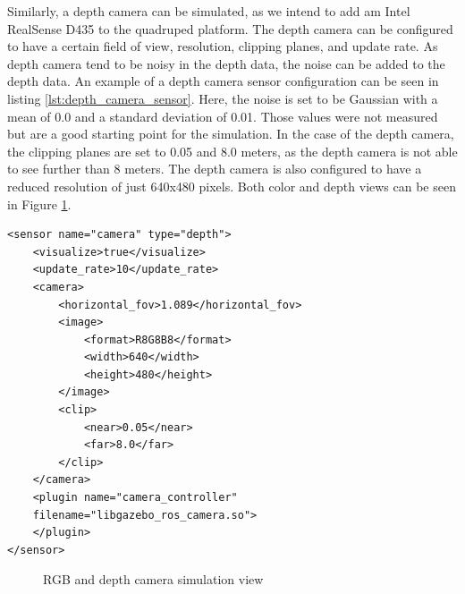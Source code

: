 \documentclass[12pt]{article}
\begin{document}
        Similarly, a depth camera can be simulated, as we intend to add am Intel RealSense D435 to the quadruped platform. The depth camera can be configured to have a certain field of view, resolution, clipping planes, and update rate. As depth camera tend to be noisy in the depth data, the noise can be added to the depth data. An example of a depth camera sensor configuration can be seen in listing \ref{lst:depth_camera_sensor}. Here, the noise is set to be Gaussian with a mean of 0.0 and a standard deviation of 0.01. Those values were not measured but are a good starting point for the simulation. In the case of the depth camera, the clipping planes are set to 0.05 and 8.0 meters, as the depth camera is not able to see further than 8 meters. The depth camera is also configured to have a reduced resolution of just 640x480 pixels. Both color and depth views can be seen in Figure \ref{fig:cameras_simulation_view}.
        
\vspace{10pt }
\begin{minipage}{0.9\textwidth}      
\begin{lstlisting}[style=xmlStyle, caption={Depth Camera Sensor Configuration}, label={lst:depth_camera_sensor}]
<sensor name="camera" type="depth">
    <visualize>true</visualize>
    <update_rate>10</update_rate>
    <camera>
        <horizontal_fov>1.089</horizontal_fov>
        <image>
            <format>R8G8B8</format>
            <width>640</width>
            <height>480</height>
        </image>
        <clip>
            <near>0.05</near>
            <far>8.0</far>
        </clip>
    </camera>
    <plugin name="camera_controller" 
    filename="libgazebo_ros_camera.so">
    </plugin>
</sensor>
\end{lstlisting}
\end{minipage}

\begin{figure}[H]
    \centering
    \caption{RGB and depth camera simulation view}
    \label{fig:cameras_simulation_view}
\end{figure}
\end{document}
